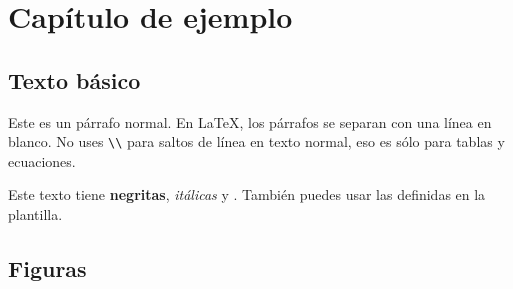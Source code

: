 ﻿%
%
%

\chapter{Capítulo de ejemplo}
\label{cap:ejemplo}


\section{Texto básico}

Este es un párrafo normal. En \LaTeX{}, los párrafos se separan con una línea en blanco.
No uses \texttt{\textbackslash\textbackslash} para saltos de línea en texto normal,
eso es sólo para tablas y ecuaciones.


Este texto tiene \textbf{negritas}, \textit{itálicas} y .
También puedes usar las  definidas en la plantilla.


\section{Figuras}
\label{sec:figuras}

%
%
%


